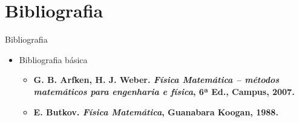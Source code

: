 \documentclass[
size=17pt,
paper=smartboard,
mode=present,
display=slidesnotes,
style=paintings,
nopagebreaks,
blackslide,
fleqn]{powerdot}
\begin{document}


  
   \section[ slide = false ]{Bibliografia}
      \begin{slide}[toc=]{Bibliografia}
         \begin{itemize}
            \item Bibliografia básica
            \begin{itemize}
               \item \textbf{G. B. Arfken, H. J. Weber. \emph{Física Matemática -- métodos matemáticos para engenharia e física}, 6ª Ed., Campus, 2007.}
               \item \textbf{E. Butkov. \emph{Física Matemática}, Guanabara Koogan, 1988.}
            \end{itemize}
         \end{itemize}
      \end{slide}
\end{document}
